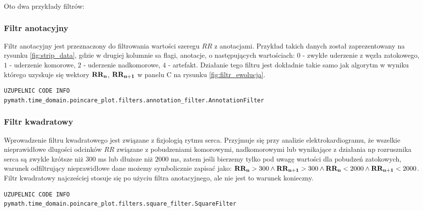 Oto dwa przykłady filtrów:
\subsubsection{Filtr anotacyjny}
Filtr anotacyjny jest przeznaczony do filtrowania wartości szeregu $RR$ z anotacjami.
Przykład takich danych został zaprezentowany na rysunku \ref{fig:strip_data}, gdzie w
drugiej kolumnie sa flagi, anotacje, o następujących wartościach: $0$ - zwykłe uderzenie
z węzła zatokowego, $1$ - uderzenie komorowe, $2$ - uderzenie nadkomorowe, $4$ - artefakt.
Działanie tego filtru jest dokładnie takie samo jak algorytm w wyniku którego uzyskuje się
wektory $\mathbf{RR_n}$, $\mathbf{RR_{n+1}}$ w panelu C na rysunku \ref{fig:filtr_ewolucja}.
\begin{verbatim}
UZUPELNIC CODE INFO
pymath.time_domain.poincare_plot.filters.annotation_filter.AnnotationFilter
\end{verbatim}

\subsubsection{Filtr kwadratowy}
Wprowadzenie filtru kwadratowego jest związane z fizjologią rytmu serca. Przyjmuje się
przy analizie elektrokardiogramu, że wszelkie nieprawidłowe dlugości odcinków $RR$
związane z pobudzeniami komorowymi, nadkomorowymi lub wynikające z działania np
rozrusznika serca są zwykle krótsze niż $300$ ms lub dłuższe niż $2000$ ms, zatem jeśli
bierzemy tylko pod uwagę wartości dla pobudzeń zatokowych, warunek odfiltrujący
nieprawidłowe dane możemy symbolicznie zapisać jako:
$\mathbf{RR_n}>300 \wedge \mathbf{RR_{n+1}}>300 \wedge \mathbf{RR_n}<2000 \wedge \mathbf{RR_{n+1}}<2000$.
Filtr kwadratowy najcześciej stosuje się po użyciu filtra anotacyjnego, ale nie jest to
warunek konieczny.

\begin{verbatim}
UZUPELNIC CODE INFO
pymath.time_domain.poincare_plot.filters.square_filter.SquareFilter
\end{verbatim} 

